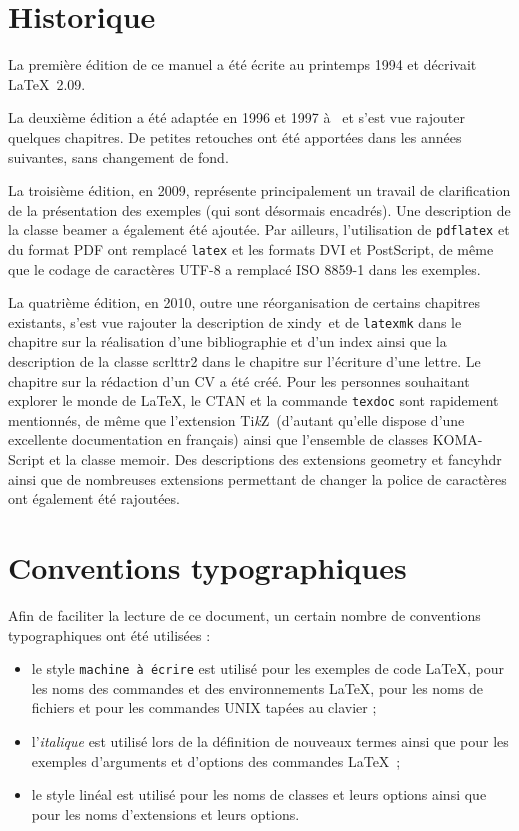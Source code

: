 \documentclass[a4paper,11pt,openbib]{book}
\newcommand{\TikZ}{Ti\textit{k}Z}
\newcommand{\xindy}{\textsf{xindy}}
\newcommand{\classe}[1]{\textsf{#1}}
\newcommand{\extension}[1]{\textsf{#1}}
\newcommand{\intercom}[1]{\texttt{#1}}
\begin{document}
\section*{Historique}

La première édition de ce manuel a été écrite au printemps 1994 et décrivait
\LaTeX\ 2.09.

La deuxième édition a été adaptée en 1996 et 1997 à \LaTeXe\ et s'est vue
rajouter quelques chapitres. De petites retouches ont été apportées dans les
années suivantes, sans changement de fond.

La troisième édition, en 2009, représente principalement un travail de
clarification de la présentation des exemples (qui sont désormais encadrés). Une
description de la classe \classe{beamer} a également été ajoutée. Par ailleurs,
l'utilisation de \intercom{pdflatex} et du format PDF ont remplacé
\intercom{latex} et les formats DVI et PostScript, de même que le codage de
caractères UTF-8 a remplacé ISO 8859-1 dans les exemples.

La quatrième édition, en 2010, outre une réorganisation de certains chapitres
existants, s'est vue rajouter la description de \xindy\ et de \intercom{latexmk}
dans le chapitre sur la réalisation d'une bibliographie et d'un index ainsi que
la description de la classe \classe{scrlttr2} dans le chapitre sur l'écriture
d'une lettre. Le chapitre sur la rédaction d'un CV a été créé. Pour les
personnes souhaitant explorer le monde de \LaTeX, le CTAN et la commande
\intercom{texdoc} sont rapidement mentionnés, de même que l'extension \TikZ\
(d'autant qu'elle dispose d'une excellente documentation en français) ainsi que
l'ensemble de classes KOMA-Script et la classe \classe{memoir}. Des descriptions
des extensions \extension{geometry} et \extension{fancyhdr} ainsi que de
nombreuses extensions permettant de changer la police de caractères ont
également été rajoutées.

\section*{Conventions typographiques}

Afin de faciliter la lecture de ce document, un certain nombre de conventions
typographiques ont été utilisées :

\begin{itemize}

\item le style \texttt{machine à écrire} est utilisé pour les exemples de code
      \LaTeX, pour les noms des commandes et des environnements \LaTeX, pour les
      noms de fichiers et pour les commandes UNIX tapées au clavier ;

\item l'\textit{italique} est utilisé lors de la définition de nouveaux termes
      ainsi que pour les exemples d'arguments et d'options des commandes
      \LaTeX\ ;

\item le style \textsf{linéal} est utilisé pour les noms de classes et leurs
      options ainsi que pour les noms d'extensions et leurs options.

\end{itemize}
\end{document}
